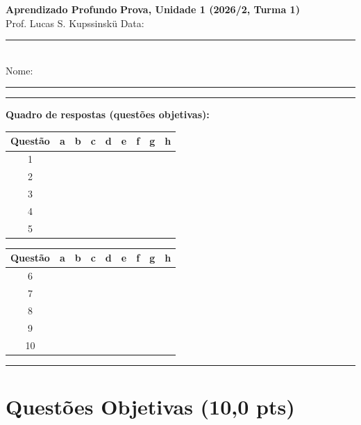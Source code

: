 \documentclass[11pt,a4paper]{article}
\renewcommand{\arraystretch}{1.4}
\begin{document}
{\Large\bfseries Aprendizado Profundo} \hfill \textbf{Prova, Unidade 1 (2026/2, Turma 1)}\\
Prof. Lucas S. Kupssinskü \hfill Data: \rule{3cm}{0.4pt}\\[0.4em]
Nome: \rule{12cm}{0.4pt}

\rule{\linewidth}{0.8pt}

\textbf{Quadro de respostas (questões objetivas):}\\[0.2em]
\begin{center}
{\renewcommand{\arraystretch}{1.15}
\begin{tabular}{|c|c|c|c|c|c|c|c|c|}
\hline
\textbf{Questão} & \textbf{a} & \textbf{b} & \textbf{c} & \textbf{d} & \textbf{e} & \textbf{f} & \textbf{g} & \textbf{h} \\\hline
1 & & & & & & & & \\\hline
2 & & & & & & & & \\\hline
3 & & & & & & & & \\\hline
4 & & & & & & & & \\\hline
5 & & & & & & & & \\\hline
\end{tabular}
\hspace{1.2em}
\begin{tabular}{|c|c|c|c|c|c|c|c|c|}
\hline
\textbf{Questão} & \textbf{a} & \textbf{b} & \textbf{c} & \textbf{d} & \textbf{e} & \textbf{f} & \textbf{g} & \textbf{h} \\\hline
6 & & & & & & & & \\\hline
7 & & & & & & & & \\\hline
8 & & & & & & & & \\\hline
9 & & & & & & & & \\\hline
10 & & & & & & & & \\\hline
\end{tabular}}
\end{center}

\rule{\linewidth}{0.4pt}

\section*{Questões Objetivas (10{,}0 pts)}
\end{document}
